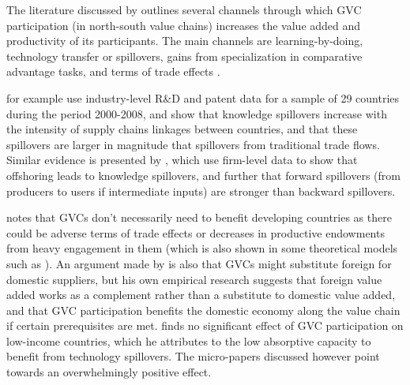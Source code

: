 \documentclass[a4paper]{article}
\begin{document}
The literature discussed by \citet{Kummritz20161} outlines several channels through which GVC participation (in north-south value chains) increases the value added and productivity of its participants. The main channels are learning-by-doing, technology transfer or spillovers, gains from specialization in comparative advantage tasks, and terms of trade effects  \citep{Kummritz20161}. \newline

\citet{piermartini2014knowledge} for example use industry-level R\&D and patent data for a sample of 29 countries during the period 2000-2008, and show that knowledge spillovers increase with the intensity of supply chains linkages between countries, and that these spillovers are larger in magnitude that spillovers from traditional trade flows. Similar evidence is presented by \citet{benz2015trade}, which use firm-level data to show that offshoring leads to knowledge spillovers, and further that forward spillovers (from producers to users if intermediate inputs) are stronger than backward spillovers. \newline

\citet{Kummritz20161} notes that GVCs don't necessarily need to benefit developing countries as there could be adverse terms of trade effects or decreases in productive endowments from heavy engagement in them (which is also shown in some theoretical models such as \citet{baldwin2014trade}). An argument made by \citet{kummritz2015global} is also that GVCs might substitute foreign for domestic suppliers, but his own empirical research suggests that 
foreign value added works as a complement rather than a substitute to domestic value added, and that GVC participation benefits the domestic economy along the value chain if certain prerequisites are met.  \citet{kummritz2015global} finds no significant effect of GVC participation on low-income countries, which he attributes to the low absorptive capacity to benefit from technology spillovers. The micro-papers discussed however point towards an overwhelmingly positive effect. \newline




\end{document}
